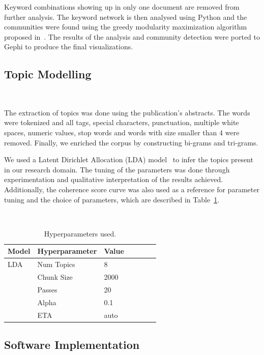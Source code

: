 \documentclass[pdflatex,sn-mathphys]{sn-jnl}%
\theoremstyle{thmstyleone}
\theoremstyle{thmstyletwo}
\theoremstyle{thmstylethree}
\begin{document}
Keyword combinations showing up in only one document are removed from further
analysis. The keyword network is then analysed using Python and the
communities were found using the greedy modularity maximization algorithm
proposed in~\cite{Clauset2004}. The results of the analysis and community
detection were ported to Gephi to produce the final visualizations.

\subsection{Topic Modelling}~\label{sec:topic_modelling}

The extraction of topics was done using the publication's abstracts. The words
were tokenized and all tags, special characters, punctuation, multiple white
spaces, numeric values, stop words and words with size smaller than 4 were
removed. Finally, we enriched the corpus by constructing bi-grams and
tri-grams.

We used a Latent Dirichlet Allocation (LDA) model~\cite{Pritchard2000} to
infer the topics present in our research domain. The tuning of the parameters
was done through experimentation and qualitative interpretation of the results
achieved. Additionally, the coherence score curve was also used as a reference for
parameter tuning and the choice of parameters, which are described in
Table~\ref{tab:hyperparameters}. 

\begin{table}[ht]
    \begin{center}
    \caption{Hyperparameters used.}~\label{tab:hyperparameters}
    \begin{tabular*}{.5\textwidth}{@{\extracolsep{\fill}}lllllll@{\extracolsep{\fill}}}
        \toprule
        Model   &   Hyperparameter  &   Value \\
        \midrule
        LDA     &   Num Topics      &   8     \\
                &   Chunk Size      &   2000  \\
                &   Passes          &   20    \\
                &   Alpha           &   0.1   \\
                &   ETA             &   auto  \\
        \bottomrule
    \end{tabular*}
    \end{center}
\end{table}

\subsection{Software Implementation}~\label{sec:software_implementation}
\end{document}
